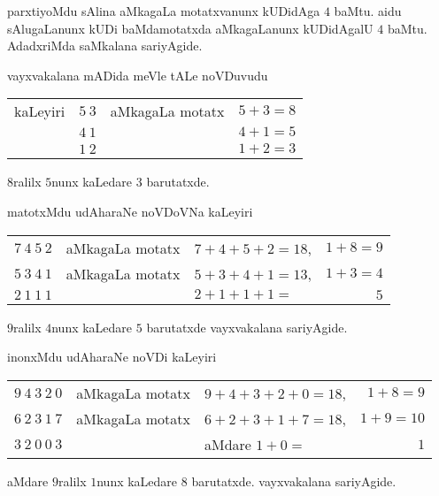 parxtiyoMdu sAlina aMkagaLa motatxvanunx kUDidAga $4$ baMtu. aidu sAlugaLanunx kUDi baMdamotatxda aMkagaLanunx kUDidAgalU $4$ baMtu. AdadxriMda saMkalana sariyAgide.

vayxvakalana mADida meVle tALe noVDuvudu

\begin{tabular}{lcll}
kaLeyiri & $5~3$ & aMkagaLa motatx & $5+3=8$\\
& $4~1$ & & $4+1=5$\\\cline{2-2}\cline{4-4}
& $1~2$ & & $1+2 =3$
\end{tabular}

$8$ralilx $5$nunx kaLedare $3$ barutatxde. 

matotxMdu udAharaNe noVDoVNa kaLeyiri

\begin{tabular}{lclr}
$7~4~5~2$ & aMkagaLa motatx & $7+4+5+2=18$, & $1+8=9$ \\
$5~3~4~1$ & aMkagaLa motatx & $5+3+4+1=13$, & $1+3=4$\\\cline{1-1}\cline{3-3}\cline{4-4}
$2~1~1~1$ & & $2+1+1+1 =$  & $5$
\end{tabular}

$9$ralilx $4$nunx kaLedare $5$ barutatxde vayxvakalana sariyAgide.

inonxMdu udAharaNe noVDi kaLeyiri

\begin{tabular}{lclr}
$9~4~3~2~0$ & aMkagaLa motatx & $9+4+3+2+0=18$, & $1+8=9$\\
$6~2~3~1~7$ & aMkagaLa motatx & $6+2+3+1+7=18$, & $1+9=10$\\\cline{1-1}\cline{3-4}
$3~2~0~0~3$ & & aMdare $1+0 =$ & $1$
\end{tabular}

aMdare $9$ralilx $1$nunx kaLedare $8$ barutatxde. vayxvakalana sariyAgide.
